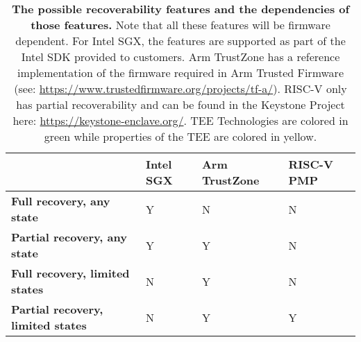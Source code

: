 \begin{table*}[p]
\begin{center}
\begin{tabular}{|L{3cm}|L{3.25cm}|L{3.25cm}|L{3.25cm}|}
\hline
\textbf{}                                                         & \textbf{Intel SGX} & \textbf{Arm TrustZone} & \textbf{RISC-V PMP} \\ \hline
{}\textbf{Full recovery, any state}         & Y                                          & N                                              & N                                           \\ \hline
{}\textbf{Partial recovery, any state}      & Y                                          & Y                                              & N                                           \\ \hline
{}\textbf{Full recovery, limited states}    & N                                          & Y                                              & N                                           \\ \hline
{}\textbf{Partial recovery, limited states} & N                                          & Y                                              & Y                                           \\ \hline
\end{tabular}
\end{center}
\caption[Recoverability Comparison]{\textbf{The possible recoverability features and the dependencies of those features.} Note that all these features will be firmware dependent. For Intel SGX, the features are supported as part of the Intel SDK provided to customers. Arm TrustZone has a reference implementation of the firmware required in Arm Trusted Firmware (see: \url{https://www.trustedfirmware.org/projects/tf-a/}). RISC-V only has partial recoverability and can be found in the Keystone Project here: \url{https://keystone-enclave.org/}. TEE Technologies are colored in \colorbox{tbl-gre}{green} while properties of the TEE are colored in \colorbox{tbl-yel}{yellow}.}
\label{tab:recover-compare}
\end{table*}

